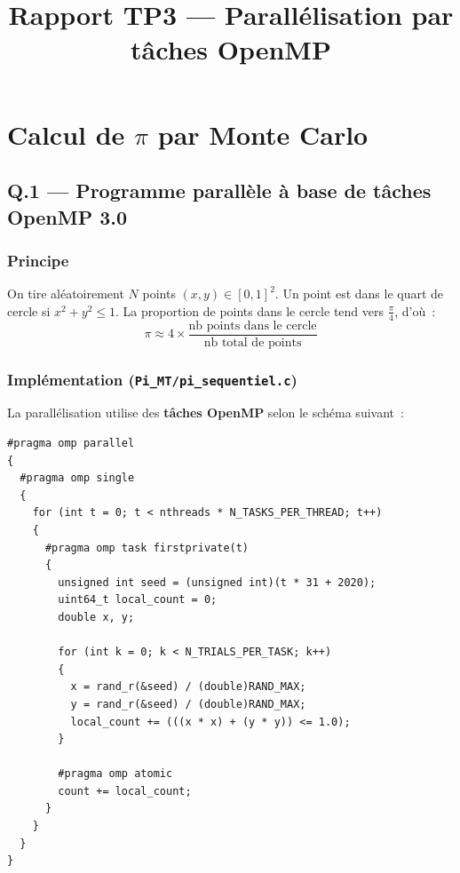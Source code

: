 \documentclass[12pt,a4paper]{article}
\title{\textbf{Rapport TP3 --- Parallélisation par tâches OpenMP}}
\author{}
\date{}
\begin{document}
\maketitle
\tableofcontents
\newpage

\section{Calcul de $\pi$ par Monte Carlo}

\subsection{Q.1 --- Programme parallèle à base de tâches OpenMP 3.0}

\subsubsection{Principe}

On tire aléatoirement $N$ points $(x, y) \in [0,1]^2$. Un point est dans le quart de cercle si $x^2 + y^2 \leq 1$. La proportion de points dans le cercle tend vers $\frac{\pi}{4}$, d'où~:
\[
\pi \approx 4 \times \frac{\text{nb points dans le cercle}}{\text{nb total de points}}
\]

\subsubsection{Implémentation (\texttt{Pi\_MT/pi\_sequentiel.c})}

La parallélisation utilise des \textbf{tâches OpenMP} selon le schéma suivant~:

\begin{lstlisting}[style=cstyle]
#pragma omp parallel
{
  #pragma omp single
  {
    for (int t = 0; t < nthreads * N_TASKS_PER_THREAD; t++)
    {
      #pragma omp task firstprivate(t)
      {
        unsigned int seed = (unsigned int)(t * 31 + 2020);
        uint64_t local_count = 0;
        double x, y;

        for (int k = 0; k < N_TRIALS_PER_TASK; k++)
        {
          x = rand_r(&seed) / (double)RAND_MAX;
          y = rand_r(&seed) / (double)RAND_MAX;
          local_count += (((x * x) + (y * y)) <= 1.0);
        }

        #pragma omp atomic
        count += local_count;
      }
    }
  }
}
\end{lstlisting}
\end{document}
